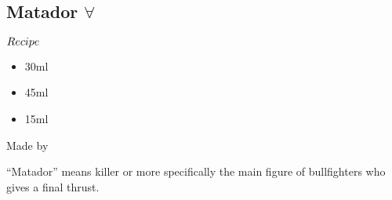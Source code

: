 \subsection{Matador $\forall$}
\begin{itembox}[l]{\boldmath $Recipe$}
\begin{itemize}
\setlength{\parskip}{0cm}
\setlength{\itemsep}{0cm}
\item \teq 30ml
\item \pj 45ml
\item \limj 15ml
\end{itemize}
\vspace{-4mm}
Made by \shake
\end{itembox}
``Matador'' means killer or more specifically the main figure of bullfighters who gives a final thrust.
